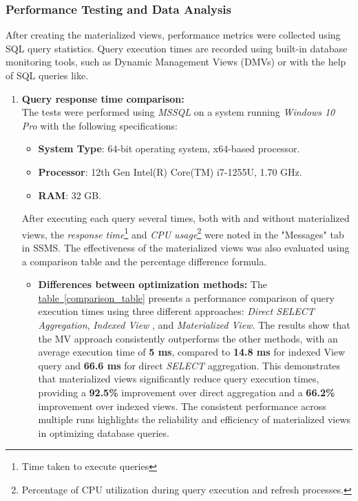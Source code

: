 

\subsubsection{Performance Testing and Data Analysis} After creating the materialized views, performance metrics were collected using SQL query statistics. Query execution times are recorded using built-in database monitoring tools, such as Dynamic Management Views (DMVs) or with the help of SQL queries like. 

 

\begin{enumerate}


    \item \textbf{ Query response time comparison:}\\
The tests were performed using \textit{MSSQL} on a system running \textit{Windows 10 Pro} with the following specifications:
\begin{itemize}
    \item \textbf{System Type}: 64-bit operating system, x64-based processor.
    \item \textbf{Processor}: 12th Gen Intel(R) Core(TM) i7-1255U, 1.70 GHz.
    \item \textbf{RAM}: 32 GB.
\end{itemize}
After executing each query several times, both with and without materialized views, the \textit{response time}\footnote{Time taken to execute queries} and \textit{CPU usage}\footnote{Percentage of CPU utilization during query execution and refresh processes.} were noted in the "Messages" tab in SSMS. The effectiveness of the materialized views was also evaluated using a comparison table and the percentage difference formula.

\begin{itemize}
\item\textbf{Differences between optimization methods:} The \hyperref[comparison_table]{table~\ref*{comparison_table}} presents a performance comparison of query execution times using three different approaches: \textit{Direct SELECT Aggregation}, \textit{Indexed View }, and \textit{Materialized View}. The results show that the MV approach consistently outperforms the other methods, with an average execution time of \textbf{5 ms}, compared to \textbf{14.8 ms} for indexed View query and \textbf{66.6 ms} for direct \textit{SELECT} aggregation. This demonstrates that materialized views significantly reduce query execution times, providing a \textbf{92.5\%} improvement over direct aggregation and a \textbf{66.2\%} improvement over indexed views. The consistent performance across multiple runs highlights the reliability and efficiency of materialized views in optimizing database queries.\vspace{.4cm}
 

\end{itemize}
\end{enumerate}
